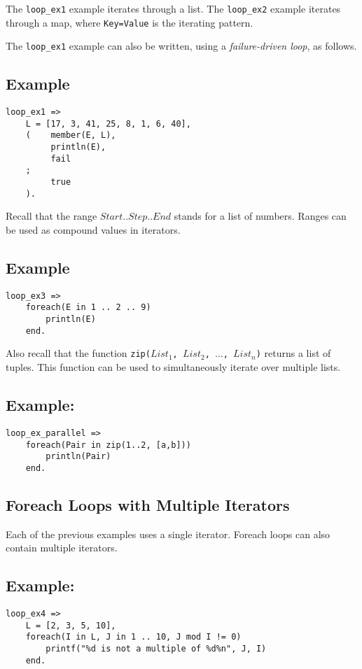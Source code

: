 The \texttt{loop\_ex1} example iterates through a list.  The \texttt{loop\_ex2} example iterates through a map, where \texttt{Key=Value} is the iterating pattern.

The \texttt{loop\_ex1} example can also be written, using a \emph{failure-driven loop}, as follows.

\subsection*{Example}
\begin{verbatim}
loop_ex1 =>
    L = [17, 3, 41, 25, 8, 1, 6, 40],
    (    member(E, L),
         println(E),
         fail
    ;
         true
    ).
\end{verbatim}


Recall that the range $Start .. Step .. End$ stands for a list of numbers.  Ranges can be used as compound values in iterators.
\subsection*{Example}
\begin{verbatim}
loop_ex3 =>
    foreach(E in 1 .. 2 .. 9)
        println(E)
    end.
\end{verbatim}

Also recall that the function \texttt{zip($List_1$, $List_2$, $\ldots$, $List_n$)} returns a list of tuples. This function can be used to simultaneously iterate over multiple lists.

\subsection*{Example:}
\begin{verbatim}
loop_ex_parallel =>
    foreach(Pair in zip(1..2, [a,b]))
        println(Pair)
    end.
\end{verbatim}


\subsection{Foreach Loops with Multiple Iterators}
Each of the previous examples uses a single iterator.  Foreach loops can also contain multiple iterators.
\subsection*{Example:}
\begin{verbatim}
loop_ex4 =>
    L = [2, 3, 5, 10],
    foreach(I in L, J in 1 .. 10, J mod I != 0)
        printf("%d is not a multiple of %d%n", J, I)
    end.
\end{verbatim}

